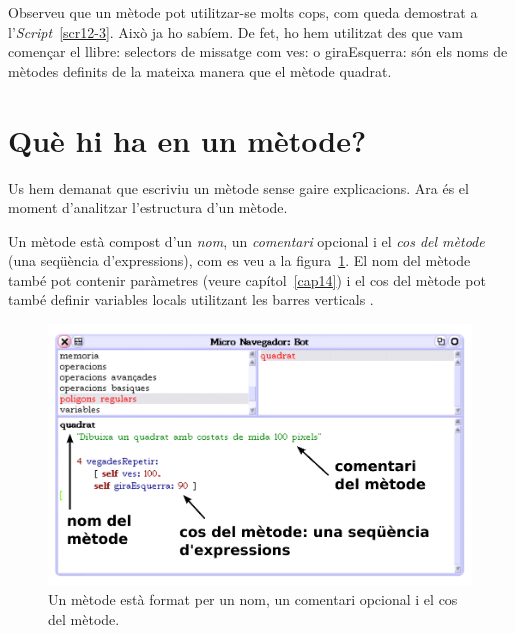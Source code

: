 Observeu que un mètode pot utilitzar-se molts cops, com queda demostrat a l'\emph{Script}~\ref{scr12-3}. Això ja ho sabíem. De fet, ho hem utilitzat des que vam començar el llibre: selectors de missatge com \textsf{ves:} o \textsf{giraEsquerra:} són els noms de mètodes definits de la mateixa manera que el mètode \textsf{quadrat}.

\section{Què hi ha en un mètode?}
Us hem demanat que escriviu un mètode sense gaire explicacions. Ara és el moment d'analitzar l'estructura d'un mètode.

Un mètode està compost d'un \emph{nom}, un \emph{comentari} opcional i el \emph{cos del mètode} (una seqüència d'expressions), com es veu a la figura~\ref{fig1206}. El nom del mètode també pot contenir paràmetres (veure capítol~\ref{cap14}) i el cos del mètode pot també definir variables locals utilitzant les barres verticals \textbar \hspace{2mm} \textbar .
\begin{figure}[h]
\begin{center}
\includegraphics[scale=0.5]{Imatges/figura12-6.pdf}
\end{center}
\caption{Un mètode està format per un nom, un comentari opcional i el cos del mètode.}
\label{fig1206}
\end{figure}

